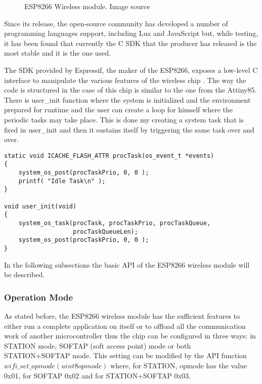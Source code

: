 \begin{figure}[h!]
    \label{fig:esp8266}
    \centerline{}
    \caption[ESP8266 Wireless module]{ESP8266 Wireless module. Image source
                                      \cite{website:esppicture}}
    \label{fig:esp8266}
\end{figure}

Since its release, the open-source community has developed a number of programming languages support,
including  Lua \cite{website:nodemcu} and JavaScript \cite{website:espruino} but, while testing, it has been
found that currently the C SDK that the producer has released is the most stable and it is the one used.

\qquad The SDK provided by Espressif, the maker of the ESP8266, exposes a low-level C interface to manipulate the
various features of the wireless chip \cite{datasheet:esp8266_api}.
The way the code is structured in the case of this chip is similar to the one from the Attiny85. There is
user\_init function where the system is initialized and the environment prepared for runtime and the user
can create a loop for himself where the periodic tasks may take place.
This is done my creating a system task that is fired in user\_init and then it sustains itself by triggering
the same task over and over.

\lstset{language=C}
\begin{lstlisting}[frame=single]
static void ICACHE_FLASH_ATTR procTask(os_event_t *events)
{
    system_os_post(procTaskPrio, 0, 0 );
    printf( "Idle Task\n" );
}

void user_init(void)
{
    system_os_task(procTask, procTaskPrio, procTaskQueue,
                   procTaskQueueLen);
    system_os_post(procTaskPrio, 0, 0 );
}
\end{lstlisting}

In the following subsections the basic API of the ESP8266 wireless module will be described.

\subsubsection{Operation Mode}
\label{sec:opmode}

\qquad As stated before, the ESP8266 wireless module has the sufficient features to either run a complete application
on itself or to offload all the communication work of another microcontroller thus the chip can be configured
in  three ways: in STATION mode, SOFTAP (soft access point) mode or both STATION+SOFTAP mode.
This setting can be modified by the API function $wifi\_set\_opmode(uint8 opmode)$ where, for STATION, opmode
has the value 0x01, for SOFTAP 0x02 and for STATION+SOFTAP 0x03.

